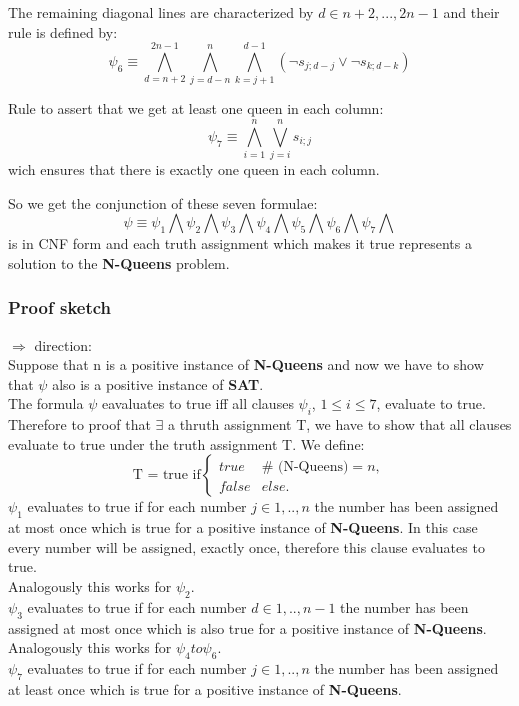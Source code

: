 \noindent The remaining diagonal lines are characterized by $d \in {n+2,...,2n-1}$ and their rule is defined by:
$$\psi_6 \equiv \bigwedge_{d=n+2}^{2n-1}\bigwedge_{j=d-n}^{n}\bigwedge_{k=j+1}^{d-1}(\neg s_{j;d-j} \vee \neg s_{k;d-k})$$

\noindent Rule to assert that we get at least one queen in each column:
$$\psi_7 \equiv \bigwedge_{i=1}^{n}\bigvee_{j=i}^{n}s_{i;j}$$
wich ensures that there is exactly one queen in each column.

\noindent So we get the conjunction of these seven formulae:
$$\psi \equiv \psi_1\bigwedge\psi_2\bigwedge\psi_3\bigwedge\psi_4\bigwedge\psi_5\bigwedge\psi_6\bigwedge\psi_7\bigwedge$$
is in CNF form and each truth assignment which makes it true represents a solution to the \textbf{N-Queens} problem.

\subsubsection{Proof sketch}
$\Rightarrow$ direction:\\
Suppose that n is a positive instance of \textbf{N-Queens} and now we have to show that
$\psi$ also is a positive instance of \textbf{SAT}.\\
The formula $\psi$ eavaluates to true iff all clauses $\psi_i$, $1 \leq i \leq 7$, evaluate to true. 
Therefore to proof that $\exists$ a thruth assignment T, we have to show that all clauses
evaluate to true under the truth assignment T. We define:\\
$$\text{T = true if} 
\left\{ 
\begin{array}{cl}
true & \# \text{ (N-Queens)} = n, \\ 
false & else.
\end{array}%
\right. $$
$\psi_1$ evaluates to true if for each number $j \in {1,..,n}$ the number 
has been assigned at most once which is true for a positive instance of \textbf{N-Queens}.
In this case every number will be assigned, exactly once, therefore this clause evaluates
to true.\\
Analogously this works for $\psi_2$.\\
$\psi_3$ evaluates to true if for each number $d \in {1,..,n-1}$ the number 
has been assigned at most once which is also true for a positive instance of \textbf{N-Queens}.\\
Analogously this works for $\psi_4 to \psi_6$.\\
$\psi_7$ evaluates to true if for each number $j \in {1,..,n}$ the number 
has been assigned at least once which is true for a positive instance of \textbf{N-Queens}.\\


